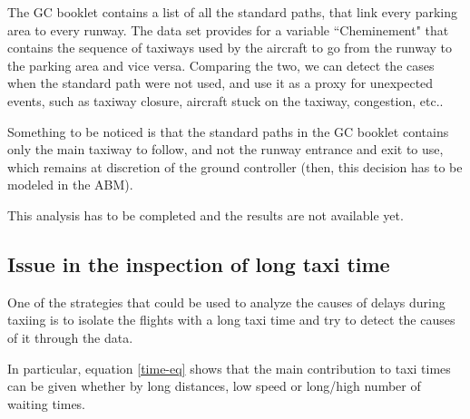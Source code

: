 \documentclass{article}
\begin{document}
The GC booklet \cite{livret} contains a list of all the standard paths, that link every parking area to every runway. The data set provides for a variable ``Cheminement" that contains the sequence of taxiways used by the aircraft to go from the runway to the parking area and vice versa. Comparing the two, we can detect the cases when the standard path were not used, and use it as a proxy for unexpected events, such as taxiway closure, aircraft stuck on the taxiway, congestion, etc..

Something to be noticed is that the standard paths in the GC booklet contains only the main taxiway to follow, and not the runway entrance and exit to use, which remains at discretion of the ground controller (then, this decision has to be modeled in the ABM).

This analysis has to be completed and the results are not available yet.


\subsection{Issue in the inspection of long taxi time}

One of the strategies that could be used to analyze the causes of delays during taxiing is to isolate the flights with a long taxi time and try to detect the causes of it through the data. 

In particular, equation \ref{time-eq} shows that the main contribution to taxi times can be given whether by long distances, low speed or long/high number of waiting times.
\end{document}
